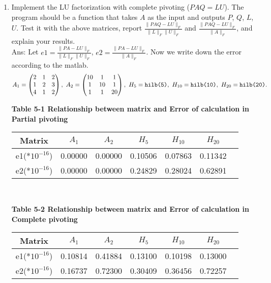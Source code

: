 \documentclass[12pt]{article}
\begin{document}
\begin{enumerate}
\begin{enumerate}
\item Implement the LU factorization with complete pivoting ($PAQ = LU$).  The program should be a function that takes $A$ as the input and outputs $P$, $Q$, $L$, $U$.  Test it with the above matrices, report $\frac{\| PAQ- LU \|_F}{\| L\|_F \| U \|_F}$ and $\frac{\| PAQ - LU \|_{F}}{\| A \|_F}$, and explain your results.\\
Ans: Let $e1=\frac{\| PA - LU \|_F}{\| L\|_F \| U \|_F}$, $e2=\frac{\| PA - LU \|_{F}}{\| A \|_F}$. Now we write down the error according to the matlab.\\
\begin{equation*} \label{eqn:1}
A_1 =
\begin{pmatrix}
2 & 1 & 2 \\
1 & 2 & 3 \\
4 & 1 & 2
\end{pmatrix},
\
A_2 =
\begin{pmatrix}
10 & 1 & 1 \\
1 & 10 & 1 \\
1 & 1 & 20
\end{pmatrix},
\
H_5 = \texttt{hilb(5)},
\
H_{10} = \texttt{hilb(10)},
\
H_{20} = \texttt{hilb(20)}.\\
\end{equation*}
\begin{center}
\bf{Table 5-1 Relationship between matrix and Error of calculation in Partial pivoting}
\end{center}
\tabcolsep0.2in
\begin{tabular}{|ccccccc|}
\hline
Matrix&$A_1$&$A_2$&$H_{5}$&$H_{10}$&$H_{20}$&\\
\hline
e1(*$10^{-16}$)&0.00000&0.00000&0.10506&0.07863&0.11342&\\
\hline
e2(*$10^{-16}$)&0.00000&0.00000&0.24829&0.28024&0.62891&\\
\hline
\end{tabular}
\
\begin{center}
\bf{Table 5-2 Relationship between matrix and Error of calculation in Complete pivoting}
\end{center}
\begin{tabular}{|ccccccc|}
\hline
Matrix&$A_1$&$A_2$&$H_{5}$&$H_{10}$&$H_{20}$&\\
\hline
e1(*$10^{-16}$)&0.10814&0.41884&0.13100&0.10198&0.13000&\\
\hline
e2(*$10^{-16}$)&0.16737&0.72300&0.30409&0.36456&0.72257&\\
\hline
\end{tabular}

\end{enumerate}
\end{enumerate}
\end{document}

